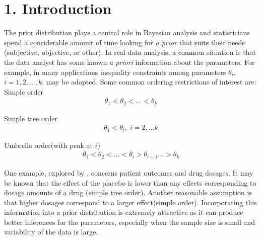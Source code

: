 \documentclass[Proceedings]{ascelike}
\begin{document}
\section{1. Introduction}
The prior distribution plays a central role in Bayesian analysis and statisticians spend a considerable amount of time looking for \emph{a prior} that suits their needs (subjective, objective, or other). In real data analysis, a common situation is that the data analyst has some known \emph{a priori} information about the parameters. For example, in many applications inequality constraints among parameters $\theta_i$, $i = 1, 2, ..., k$, may be adopted. Some common ordering restrictions of interest are:\\

Simple order
\begin{eqnarray}
\theta_1<\theta_2<...<\theta_k\nonumber
\end{eqnarray}

Simple tree order
\begin{eqnarray}
\theta_1<\theta_i,\;i=2,...k\nonumber
\end{eqnarray}

Umbrella order(with peak at $i$)
\begin{eqnarray}
\theta_1<\theta_2<...<\theta_i>\theta_{i+1}...>\theta_k\nonumber
\end{eqnarray}
% 

One example, explored by \cite{McDermott}, concerns patient outcomes and drug dosages. It may be known that the effect of the placebo is lower than any effects corresponding to dosage amounts of a drug (simple tree order). Another reasonable assumption is that higher dosages correspond to a larger effect(simple order). Incorporating this information into a prior distribution is extremely attractive as it can produce better inferences for the parameters, especially when the sample size is small and variability of the data is large.
\end{document}
